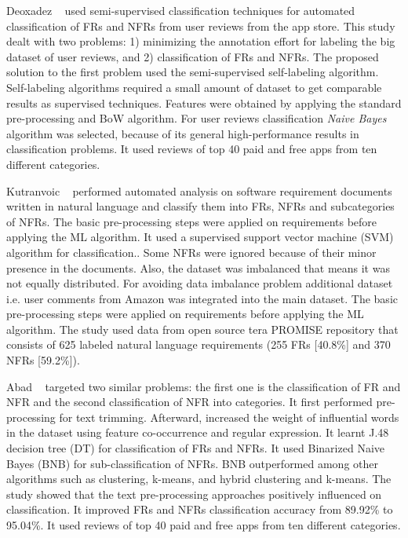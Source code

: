 	Deoxadez \etal~\cite{Deocadez:2017} used semi-supervised classification
techniques for automated classification of FRs and NFRs from user reviews from
the app store. This study dealt with two problems: 1) minimizing the annotation
effort for labeling the big dataset of user reviews, and 2) classification of
FRs and NFRs. The proposed solution to the first problem used
the semi-supervised self-labeling algorithm. Self-labeling algorithms required a
small amount of dataset to get comparable results as supervised techniques. Features were obtained
by applying the standard pre-processing and BoW algorithm. For user reviews classification \emph{Naive Bayes}
algorithm was selected, because of its general high-performance results in classification
problems. It used reviews of top 40 paid and free apps from ten
different categories.

	Kutranvoic \etal ~ \cite {Kurtanovic:2017} performed automated analysis on
software requirement documents written in natural language  and classify them into FRs,
NFRs and subcategories of NFRs. The basic pre-processing steps were applied on requirements before applying the ML algorithm. It used a supervised support vector machine (SVM) algorithm for classification.. Some NFRs were ignored because of their minor presence in the documents. Also, the dataset was imbalanced that means it was not equally distributed. For avoiding data imbalance problem additional dataset i.e. user comments
from Amazon was integrated into the main dataset. The basic pre-processing steps were applied on requirements before applying the ML algorithm. The study used data from open source tera PROMISE repository that consists of 625 labeled natural language requirements (255 FRs
[40.8\%] and 370 NFRs [59.2\%]).

	Abad \etal ~ \cite{Abad:2017} targeted two similar problems: the first one is the classification of FR and NFR and the second classification of NFR into categories.
 It first performed pre-processing for text trimming. Afterward, increased the weight of influential words in the
dataset using feature co-occurrence and regular
expression. It learnt J.48 decision tree (DT) for classification of FRs and NFRs. It used Binarized Naive Bayes (BNB) for sub-classification of NFRs. BNB outperformed among other algorithms such as clustering, k-means, and hybrid clustering and k-means. 
The study showed that the text pre-processing approaches positively influenced on classification. It improved FRs and NFRs
 classification accuracy from 89.92\% to 95.04\%. It used reviews of top 40 paid and free apps from ten
different categories.

